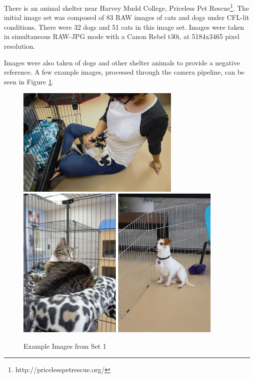 \documentclass{report}
\begin{document}
There is an animal shelter near Harvey Mudd College, Priceless Pet Rescue\footnote{http://pricelesspetrescue.org/}. The initial image set was composed of 83 RAW images of cats and dogs under CFL-lit conditions. There were 32 dogs and 51 cats in this image set. Images were taken in simultaneous RAW-JPG mode with a Canon Rebel t30i, at 5184x3465 pixel resolution.

Images were also taken of dogs and other shelter animals to provide a negative reference. A few example images, processed through the camera pipeline, can be seen in Figure \ref{set1}.

\begin{figure}[!htb]
	\begin{center}
		\caption{Example Images from Set 1}
		\label{set1}
		\includegraphics[width=8cm]{set1_cat1.JPG}
		\includegraphics[width=5cm]{set1_cat2.JPG}
		\includegraphics[width=5cm]{set1_dog.JPG}
	\end{center}
\end{figure}
\end{document}
